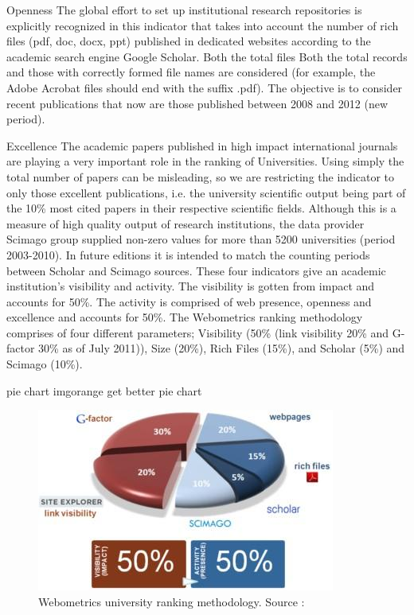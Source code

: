 Openness
The global effort to set up institutional research repositories is explicitly recognized in this indicator that takes into account the number of rich files (pdf, doc, docx, ppt) published in dedicated websites according to the academic search engine Google Scholar. Both the total files Both the total records and those with correctly formed file names are considered (for example, the Adobe Acrobat files should end with the suffix .pdf). The objective is to consider recent publications that now are those published between 2008 and 2012 (new period).

Excellence
The academic papers published in high impact international journals are playing a very important role in the ranking of Universities. Using simply the total number of papers can be misleading, so we are restricting the indicator to only those excellent publications, i.e. the university scientific output being part of the 10\% most cited papers in their respective scientific fields. Although this is a measure of high quality output of research institutions, the data provider Scimago group supplied non-zero values for more than 5200 universities (period 2003-2010). In future editions it is intended to match the counting periods between Scholar and Scimago sources.
These four indicators give an academic institution’s visibility and activity. The visibility is gotten from impact and accounts for 50\%. The activity is comprised of web presence, openness and excellence
and accounts for 50\%. The Webometrics ranking methodology comprises of four different parameters; Visibility (50\% (link
visibility 20\% and G-factor 30\% as of July 2011)), Size (20\%), Rich Files (15\%), and Scholar (5\%) and
Scimago (10\%).
\begin {review_comment}{pie chart img}{orange}
{get better pie chart}
\end{review_comment}
\begin{figure}
	\includegraphics[width=\linewidth,scale=0.5]{../static/img/analysis_model.jpg}
	\caption{Webometrics university ranking methodology. Source :}
\end{figure}
